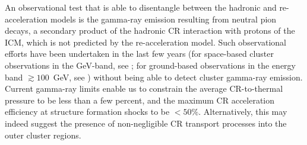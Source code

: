 \documentclass[useAMS,usenatbib]{mn2e}
\begin{document}
An observational test that is able to disentangle between the hadronic and
re-acceleration models is the gamma-ray emission resulting from neutral pion
decays, a secondary product of the hadronic CR interaction with protons of the
ICM, which is not predicted by the re-acceleration model. Such observational
efforts have been undertaken in the last few years (for space-based cluster
observations in the GeV-band, see \citealt{2003ApJ...588..155R,
  2010JCAP...05..025A,2010ApJ...717L..71A,2012arXiv1207.6749H,
  2013arXiv1308.5654T,2013arXiv1308.6278H,2013arXiv1309.0197P}; for ground-based
observations in the energy band $\gtrsim100$~GeV, see
\citealt{2006ApJ...644..148P, 2008AIPC.1085..569P,
  2009arXiv0907.0727T,2009A&A...495...27A, 2009arXiv0907.3001D,
  2009arXiv0907.5000G, cangaroo_clusters, 2009ApJ...706L.275A,
  2010ApJ...710..634A, 2011arXiv1111.5544M,2012...VERITAS,2012A&A...545A.103H})
without being able to detect cluster gamma-ray emission. Current gamma-ray 
limits enable us to constrain the average CR-to-thermal pressure to be less than a few
percent, and the maximum CR acceleration efficiency at structure formation shocks 
to be $<50\%$. Alternatively, this may indeed suggest the presence of non-negligible 
CR transport processes into the outer cluster regions. 
\end{document}
